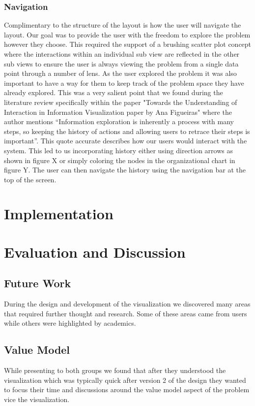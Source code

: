 \documentclass[journal]{vgtc}                %
\begin{document}
\subsubsection{Navigation}
Complimentary to the structure of the layout is how the user will navigate the layout.  Our goal was to provide the user with the freedom to explore the problem however they choose.  This required the support of a brushing scatter plot concept where the interactions within an individual sub view are reflected in the other sub views to ensure the user is always viewing the problem from a single data point through a number of lens.
As the user explored the problem it was also important to have a way for them to keep track of the problem space they have already explored.  This was a very salient point that we found during the literature review specifically within the paper "Towards the Understanding of Interaction in Information Visualization paper by Ana Figueiras" where the author mentions “Information exploration is inherently a process with many steps, so keeping the history of actions and allowing users to retrace their steps is important”.  This quote accurate describes how our users would interact with the system.  This led to us incorporating history either using direction arrows as shown in figure X or simply coloring the nodes in the organizational chart in figure Y.  The user can then navigate the history using the navigation bar at the top of the screen.

\section{Implementation}

\section{Evaluation and Discussion}

\subsection{Future Work}
During the design and development of the visualization we discovered many areas that required further thought and research.  Some of these areas came from users while others were highlighted by academics.

\subsection{Value Model}
While presenting to both groups we found that after they understood the visualization which was typically quick after version 2 of the design they wanted to focus their time and discussions around the value model aspect of the problem vice the visualization.
\end{document}
